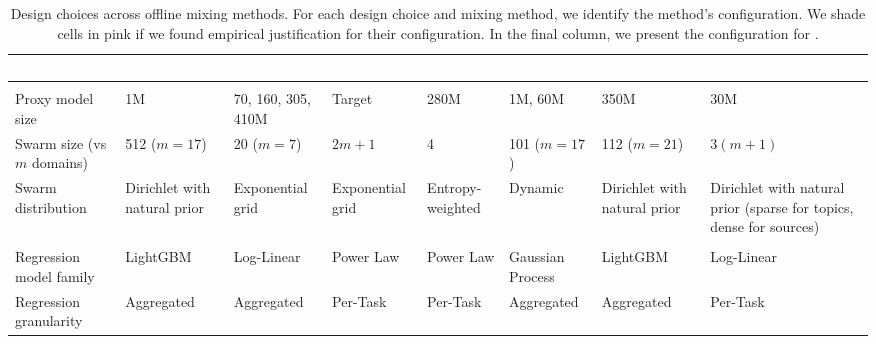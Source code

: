 \begin{table}[t]
    \centering
    \caption{Design choices across offline mixing methods. For each design choice and mixing method, we identify the method's configuration. We shade cells in pink if we found empirical justification for their configuration. In the final column, we present the configuration for \base.}
    \begin{footnotesize}
    \setlength{\tabcolsep}{3pt}
    \begin{tabular}
{L{2.0cm}C{1.9cm}C{1.9cm}C{1.9cm}C{1.9cm}C{1.9cm}C{1.9cm}C{1.9cm}}
        \toprule
         & ~\citep{liu2025regmixdatamixtureregression} & ~\citep{ye2025datamixinglawsoptimizing} & ~\citep{kang2025autoscalescaleawaredatamixing} & ~\citep{ge2025bimixbivariatedatamixing} &  \newline \citep{chen2025admirebayesoptaccelerateddatamixture} & ~\citep{diao2025climbclusteringbasediterativedata} &  \\
        \midrule
         \\
        \midrule
        Proxy model size &  1M
 &  70, 160, 305, 410M & Target & 280M & 1M, 60M &  350M &  30M \\
        Swarm size (vs $m$ domains) & 512 ($m=17$) &  20 ($m=7$) & $2m+1$ & 4 & 101 ($m=17$) &  112 ($m=21$) &  $3(m+1)$ \\
        Swarm distribution & Dirichlet with natural prior & Exponential grid & Exponential grid & Entropy-weighted & Dynamic &  Dirichlet with natural prior &  Dirichlet with natural prior (sparse for topics, dense for sources) \\
        \midrule
         \\
        \midrule
        Regression model family &  LightGBM &  Log-Linear &  Power Law &  Power Law &  Gaussian Process &  LightGBM &  Log-Linear \\
        Regression granularity & Aggregated & Aggregated & Per-Task & Per-Task & Aggregated & Aggregated &  Per-Task \\

\end{tabular}
\end{footnotesize}
\end{table}
